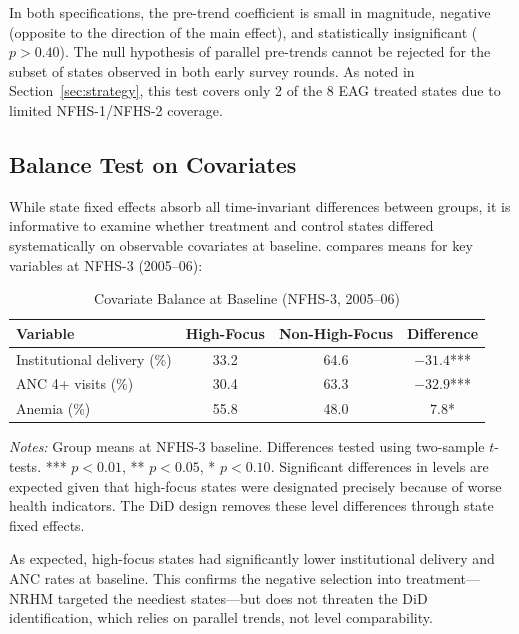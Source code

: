 \documentclass[12pt]{article}
\begin{document}
In both specifications, the pre-trend coefficient is small in magnitude, negative (opposite to the direction of the main effect), and statistically insignificant ($p > 0.40$). The null hypothesis of parallel pre-trends cannot be rejected for the subset of states observed in both early survey rounds. As noted in Section~\ref{sec:strategy}, this test covers only 2 of the 8 EAG treated states due to limited NFHS-1/NFHS-2 coverage.

\subsection{Balance Test on Covariates}

While state fixed effects absorb all time-invariant differences between groups, it is informative to examine whether treatment and control states differed systematically on observable covariates at baseline.  compares means for key variables at NFHS-3 (2005--06):

\begin{table}[H]
\centering
\caption{Covariate Balance at Baseline (NFHS-3, 2005--06)}
\label{tab:balance}
\begin{threeparttable}
\begin{tabular}{lccc}
\toprule
Variable & High-Focus & Non-High-Focus & Difference \\
\midrule
Institutional delivery (\%) & 33.2 & 64.6 & $-31.4$*** \\
ANC 4+ visits (\%) & 30.4 & 63.3 & $-32.9$*** \\
Anemia (\%) & 55.8 & 48.0 & $7.8$* \\
\bottomrule
\end{tabular}
\begin{tablenotes}[flushleft]
\small
\item \textit{Notes:} Group means at NFHS-3 baseline. Differences tested using two-sample $t$-tests. *** $p<0.01$, ** $p<0.05$, * $p<0.10$. Significant differences in levels are expected given that high-focus states were designated precisely because of worse health indicators. The DiD design removes these level differences through state fixed effects.
\end{tablenotes}
\end{threeparttable}
\end{table}

As expected, high-focus states had significantly lower institutional delivery and ANC rates at baseline. This confirms the negative selection into treatment---NRHM targeted the neediest states---but does not threaten the DiD identification, which relies on parallel trends, not level comparability.
\end{document}

